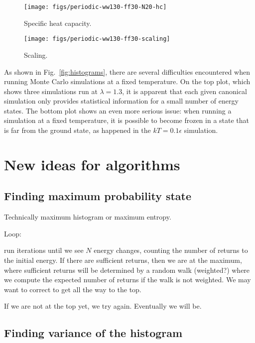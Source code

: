 \documentclass[letterpaper,twocolumn,amsmath,amssymb,pre,aps,10pt]{revtex4-1}
\begin{document}
\begin{figure}
  \texttt{[image: figs/periodic-ww130-ff30-N20-hc]}
  \caption{Specific heat capacity.\label{fig:hc}}
\end{figure}


\begin{figure}
  \texttt{[image: figs/periodic-ww130-ff30-scaling]}
  \caption{Scaling.\label{fig:scaling}}
\end{figure}

As shown in Fig.~\ref{fig:histograms}, there are several difficulties
encountered when running Monte Carlo simulations at a fixed
temperature.  On the top plot, which shows three simulations run at
$\lambda = 1.3$, it is apparent that each given canonical simulation
only provides statistical information for a small number of energy
states.  The bottom plot shows an even more serious issue: when
running a simulation at a fixed temperature, it is possible to become
frozen in a state that is far from the ground state, as happened in
the $kT=0.1\epsilon$ simulation.

\section{New ideas for algorithms}

\subsection{Finding maximum probability state}

Technically maximum histogram or maximum entropy.

Loop:

run iterations until we see $N$ energy changes, counting the number of
returns to the initial energy.  If there are sufficient returns, then
we are at the maximum, where sufficient returns will be determined by
a random walk (weighted?) where we compute the expected number of
returns if the walk is not weighted.  We may want to correct to get
all the way to the top.

If we are not at the top yet, we try again.  Eventually we will be.

\subsection{Finding variance of the histogram}
\end{document}
